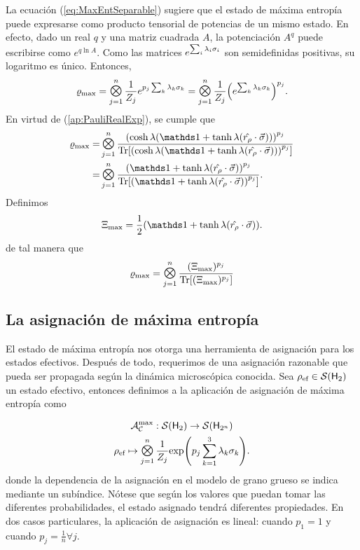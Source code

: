 La ecuación (\ref{eq:MaxEntSeparable}) sugiere que el estado de máxima entropía puede expresarse como producto tensorial de potencias de un mismo estado. En efecto, dado un real $q$ y una matriz cuadrada $A$, la potenciación $A^{q}$ puede escribirse como $e^{q \ln A}$. Como las matrices $e^{\sum_{i}\lambda_{i}\sigma_{i}}$ son semidefinidas positivas, su logaritmo es único. Entonces,
\begin{equation}
    \varrho_{\max}=\Motimes_{j=1}^{n}\frac{1}{Z_{j}}e^{p_{j}\sum_{k}\lambda_{k}\pauli{k}}=\Motimes_{j=1}^{n}\frac{1}{Z_{j}}\qty(e^{\sum_{k}\lambda_{k}\pauli{k}})^{p_{j}}.\nonumber
\end{equation}
En virtud de (\ref*{ap:PauliRealExp}), se cumple que
\begin{align}
  \varrho_{\max}=&\Motimes_{j=1}^{n}\frac{\qty(\cosh{\lambda}(\Id+\tanh{\lambda}(\paulivec{r_{\rho}})))^{p_{j}}}{\Tr[\qty(\cosh{\lambda}(\Id+\tanh{\lambda}(\paulivec{r_{\rho}})))^{p_{j}}]}\nonumber\\
  =&\Motimes_{j=1}^{n}\frac{\qty(\Id+\tanh{\lambda}(\paulivec{r_{\rho}}))^{p_{j}}}{\Tr[\qty(\Id+\tanh{\lambda}(\paulivec{r_{\rho}}))^{p_{j}}]}.\nonumber
\end{align}
Definimos
\begin{equation}\label{eq:Xi}
  \Xi_{\max}=\frac{1}{2}(\Id+\tanh{\lambda}(\paulivec{r_{\rho}})).
\end{equation}
de tal manera que 
\begin{equation}\label{eq:MaxEntSeparablePower}
  \varrho_{\max}=\Motimes_{j=1}^{n}\frac{(\Xi_{\max})^{p_{j}}}{\Tr[ (\Xi_{\max})^{p_{j}}]}
\end{equation}

\subsection{La asignación de máxima entropía}

El estado de máxima entropía nos otorga una herramienta de asignación para los estados efectivos. Después de todo, requerimos de una asignación razonable que pueda ser propagada según la dinámica microscópica conocida. Sea $\rho_{\text{ef}}\in\mathcal{S}({\sf H}_{2})$ un estado efectivo, entonces definimos a la aplicación de asignación de máxima entropía como

\begin{gather}\label{eq:MaxEntAss}
    \mcA_{\mcC}^{\max}:\densityspace{2}\rightarrow\densityspace{2^{n}}\nonumber\\
    \rho_{\ef} \mapsto \Motimes_{j=1}^{n}\frac{1}{Z_{j}}\text{exp}\qty(p_{j}\sum_{k=1}^{3}\lambda_{k}\sigma_{k}).
\end{gather}
donde la dependencia de la asignación en el modelo de grano grueso se indica mediante un subíndice. Nótese que según los valores que puedan tomar las diferentes probabilidades, el estado asignado tendrá diferentes propiedades. En dos casos particulares, la aplicación de asignación es lineal: cuando $p_{1}=1$ y cuando $p_{j}=\frac{1}{n}\forall j$.

